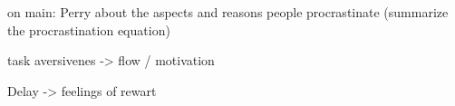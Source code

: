 on main: Perry about the aspects and reasons people procrastinate (summarize the procrastination equation)

task aversivenes -> flow / motivation




Delay -> feelings of rewart
